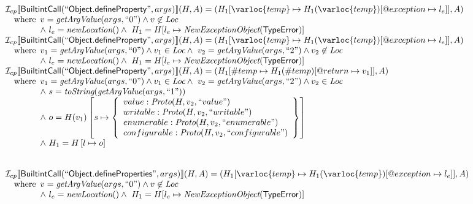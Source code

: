 \[
\begin{array}{l}
\I _{cp}\lbr \SF{BuiltintCall}(``\SF{Object.defineProperty}",args)\rbr(H,A)
 = (H_1[\varloc{temp}\mapsto H_1(\varloc{temp})[\varprop{exception}\mapsto l_{e}]], A) \\
\quad\wherec{
  v = \hf{getArgValue}(args, ``0") \land v\not\in\Loc\\
  \land\ l_e = \hf{newLocation}() \land\ H_1=H[l_e\mapsto\hf{NewExceptionObject}(\SF{TypeError})] }\\

\I _{cp}\lbr \SF{BuiltintCall}(``\SF{Object.defineProperty}",args)\rbr(H,A)
 = (H_1[\varloc{temp}\mapsto H_1(\varloc{temp})[\varprop{exception}\mapsto l_{e}]], A) \\
\quad\wherec{
  v_1 = \hf{getArgValue}(args, ``0") \land v_1 \in\Loc
  \land\ v_2 = \hf{getArgValue}(args, ``2") \land v_2 \not\in \Loc\\
  \land\ l_e = \hf{newLocation}() \land\ H_1=H[l_e\mapsto\hf{NewExceptionObject}(\SF{TypeError})] }\\

\I _{cp}\lbr \SF{BuiltintCall}(``\SF{Object.defineProperty}",args)\rbr(H,A)
 = (H_1[\#temp \mapsto H_1(\#temp)[@return \mapsto v_1]], A)\\
\quad\wherec{
  v_1 = \hf{getArgValue}(args, ``0") \land v_1 \in\Loc
  \land\ v_2 = \hf{getArgValue}(args, ``2") \land v_2 \in \Loc\\
  \land\ s = \hf{toString}(\hf{getArgValue}(args, ``1"))\\
  \land\ o = H(v_1)\left[
    s \mapsto \left\{
      \begin{array}{l}
        value: \hf{Proto}(H, v_2, ``value")\\
        writable: \hf{Proto}(H, v_2, ``writable") \\
        enumerable: \hf{Proto}(H, v_2, ``enumerable")\\
        configurable: \hf{Proto}(H, v_2, ``configurable")\\
      \end{array}
      \right\}
    \right]\\ 
  \land\ H_1=H\left[l\mapsto o\right]}\\
\\\\


\I _{cp}\lbr \SF{BuiltintCall}(``\SF{Object.defineProperties}",args)\rbr(H,A)
 = (H_1[\varloc{temp}\mapsto H_1(\varloc{temp})[\varprop{exception}\mapsto l_{e}]], A) \\
\quad\wherec{
  v = \hf{getArgValue}(args, ``0") \land v\not\in\Loc\\
  \land\ l_e = \hf{newLocation}() \land\ H_1=H[l_e\mapsto\hf{NewExceptionObject}(\SF{TypeError})] }\\


\end{array}\]
